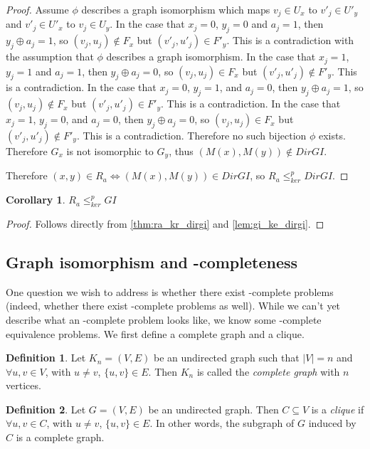 \documentclass{article}
\newtheorem{corollary}[corollary]{Corollary}
\theoremstyle{definition} \newtheorem{definition}[definition]{Definition}
\newcommand{\kr}{\leq^{p}_{ker}} %
\newcommand{\defn}[1]{\emph{#1}} %
\begin{document}
\begin{proof}
  Assume $\phi$ describes a graph isomorphism which maps $v_j\in U_x$ to
  $v'_j\in U'_y$ and $v'_j\in U'_x$ to $v_j\in U_y$. In the case that $x_j=0$,
  $y_j=0$ and $a_j=1$, then $y_j\oplus a_j=1$, so $(v_j, u_j)\notin F_x$ but
  $(v'_j, u'_j)\in F'_y$. This is a contradiction with the assumption that
  $\phi$ describes a graph isomorphism. In the case that $x_j=1$, $y_j=1$ and
  $a_j=1$, then $y_j\oplus a_j=0$, so $(v_j, u_j)\in F_x$ but $(v'_j,
  u'_j)\notin F'_y$. This is a contradiction. In the case that $x_j=0$,
  $y_j=1$, and $a_j=0$, then $y_j\oplus a_j=1$, so $(v_j, u_j)\notin F_x$ but
  $(v'_j, u'_j)\in F'_y$. This is a contradiction. In the case that $x_j=1$,
  $y_j=0$, and $a_j=0$, then $y_j\oplus a_j=0$, so $(v_j, u_j)\in F_x$ but
  $(v'_j, u'_j)\notin F'_y$. This is a contradiction. Therefore no such
  bijection $\phi$ exists. Therefore $G_x$ is not isomorphic to $G_y$, thus
  $(M(x), M(y))\notin DirGI$.

  Therefore $(x, y)\in R_a\iff (M(x), M(y))\in DirGI$, so $R_a\kr DirGI$.
\end{proof}

\begin{corollary}$R_a\kr GI$\end{corollary}
\begin{proof}Follows directly from \autoref{thm:ra_kr_dirgi} and
  \autoref{lem:gi_ke_dirgi}.\end{proof}

\subsection{Graph isomorphism and \texorpdfstring{\NPEq}{NPEq}-completeness}

One question we wish to address is whether there exist \NPEq-complete problems
(indeed, whether there exist \PEq-complete problems as well). While we can't
yet describe what an \NPEq-complete problem looks like, we know some
\NP-complete equivalence problems. We first define a complete graph and a
clique.

\begin{definition}
  Let $K_n=(V, E)$ be an undirected graph such that $|V|=n$ and $\forall u,v\in
  V$, with $u\neq v$, $\{u,v\}\in E$. Then $K_n$ is called the \defn{complete
    graph} with $n$ vertices.
\end{definition}
\begin{definition}
  Let $G=(V,E)$ be an undirected graph. Then $C\subseteq V$ is a \defn{clique}
  if $\forall u,v\in C$, with $u\neq v$, $\{u, v\}\in E$. In other words, the
  subgraph of $G$ induced by $C$ is a complete graph.
\end{definition}
\end{document}
